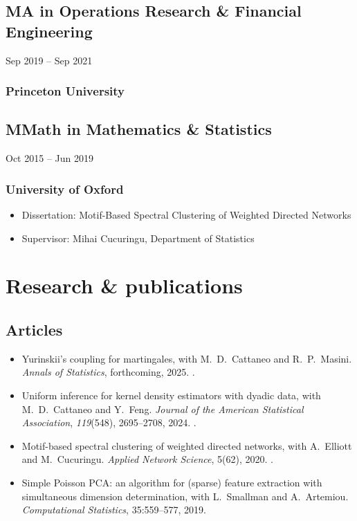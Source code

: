 \documentclass{wgu-cv}
\begin{document}
\subsection{MA in Operations Research \& Financial Engineering}
{Sep 2019 -- Sep 2021}
\subsubsection{Princeton University}

\subsection{MMath in Mathematics \& Statistics}
{Oct 2015 -- Jun 2019}
\subsubsection{University of Oxford}

\begin{itemize}
  \item Dissertation:
    Motif-Based Spectral Clustering of Weighted Directed Networks
  \item Supervisor:
    Mihai Cucuringu,
    Department of Statistics
\end{itemize}

\pagebreak

\section{Research \& publications}

\subsection{Articles}{}
\begin{itemize}

  \item Yurinskii's coupling for martingales,
    with M.\ D.\ Cattaneo and R.\ P.\ Masini.
    \emph{Annals of Statistics}, forthcoming, 2025.
    .

  \item Uniform inference for kernel density estimators with dyadic data,
    with M.\ D.\ Cattaneo and Y.\ Feng.
    \emph{Journal of the American Statistical Association},
    \emph{119}(548), 2695--2708, 2024.
    .

  \item Motif-based spectral clustering of weighted directed networks,
    with A.\ Elliott and M.\ Cucuringu.
    \emph{Applied Network Science}, 5(62), 2020.
    .

  \item Simple Poisson PCA: an algorithm for (sparse) feature extraction
    with simultaneous dimension determination,
    with L.\ Smallman and A.\ Artemiou.
    \emph{Computational Statistics}, 35:559--577, 2019.

\end{itemize}
\end{document}
